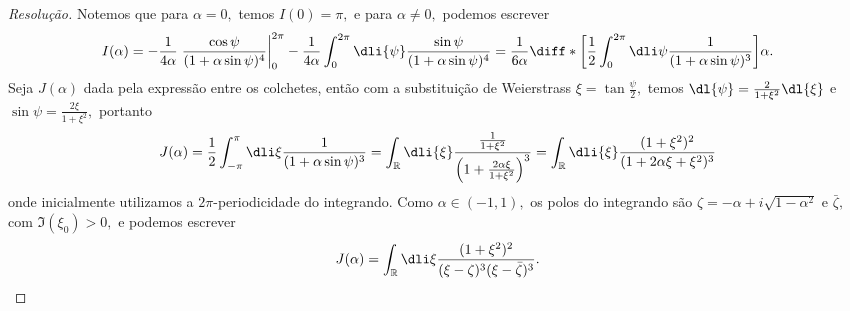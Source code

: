 \begin{proof}[Resolução]
    Notemos que para \(\alpha = 0,\) temos \(I(0) = \pi,\) e para \(\alpha \neq 0,\) podemos escrever
    \begin{equation*}
        I(\alpha) = -\frac{1}{4\alpha} \left.\frac{\cos\psi}{(1 + \alpha \sin\psi)^4}\right\rvert_0^{2\pi} - \frac{1}{4\alpha} \int_0^{2\pi} \dli{\psi} \frac{\sin\psi}{(1 + \alpha \sin \psi)^4} = \frac1{6 \alpha} \diff*{\left[\frac12\int_0^{2\pi}\dli\psi \frac{1}{(1 + \alpha \sin\psi)^3}\right]}{\alpha}.
    \end{equation*}
    Seja \(J(\alpha)\) dada pela expressão entre os colchetes, então com a substituição de Weierstrass \(\xi = \tan\frac{\psi}{2},\) temos \(\dl{\psi} = \frac{2}{1 + \xi^2} \dl{\xi}\) e \(\sin\psi = \frac{2 \xi}{1 + \xi^2},\) portanto
    \begin{equation*}
        J(\alpha) = \frac12 \int_{-\pi}^\pi \dli\xi \frac{1}{(1 + \alpha \sin\psi)^3} = \int_{\mathbb{R}} \dli{\xi} \frac{\frac{1}{1 + \xi^2}}{\left(1 + \frac{2 \alpha \xi}{1 + \xi^2}\right)^3} = \int_{\mathbb{R}}\dli{\xi}\frac{(1 + \xi^2)^2}{(1 + 2 \alpha \xi + \xi^2)^3}
    \end{equation*}
    onde inicialmente utilizamos a \(2\pi\)-periodicidade do integrando. Como \(\alpha \in (-1,1),\) os polos do integrando são \(\zeta = -\alpha + i \sqrt{1 - \alpha^2}\) e \(\bar{\zeta},\) com \(\Im(\xi_0) > 0,\) e podemos escrever
    \begin{equation*}
        J(\alpha) = \int_{\mathbb{R}} \dli\xi\frac{(1 + \xi^2)^2}{(\xi - \zeta)^3 (\xi - \bar{\zeta})^3}.
    \end{equation*}


\end{proof}
